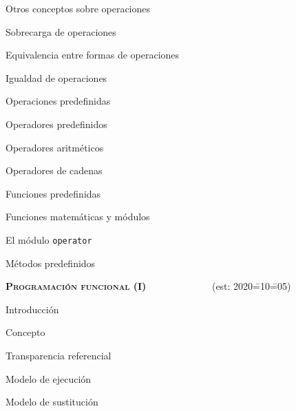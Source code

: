 \begin{longenum}
\begin{longenum}
\begin{longenum}
        \end{longenum}
        \item Otros conceptos sobre operaciones
        \begin{longenum}
            \item Sobrecarga de operaciones
            \item Equivalencia entre formas de operaciones
            \item Igualdad de operaciones
        \end{longenum}
        \item Operaciones predefinidas
        \begin{longenum}
            \item Operadores predefinidos
            \begin{longenum}
                \item Operadores aritméticos
                \item Operadores de cadenas
            \end{longenum}
            \item Funciones predefinidas
            \begin{longenum}
                \item Funciones matemáticas y módulos
                \begin{longenum}
                    \item El módulo \texttt{operator}
                \end{longenum}
            \end{longenum}
            \item Métodos predefinidos
        \end{longenum}
    \end{longenum}
    \item \textbf{\textsc{Programación funcional (I)}} \ \ \ \ \ \ \ \ \ \ \ \ \ (est: 2020\==10\==05)
    \begin{longenum}
        \item Introducción
        \begin{longenum}
            \item Concepto
            \item Transparencia referencial
            \item Modelo de ejecución
            \begin{longenum}
                \item Modelo de sustitución

\end{longenum}
\end{longenum}
\end{longenum}
\end{longenum}
